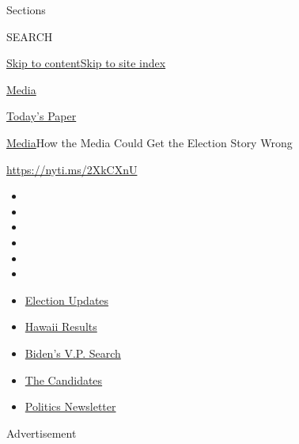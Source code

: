 Sections

SEARCH

\protect\hyperlink{site-content}{Skip to
content}\protect\hyperlink{site-index}{Skip to site index}

\href{https://www.nytimes.com/section/business/media}{Media}

\href{https://myaccount.nytimes.com/auth/login?response_type=cookie\&client_id=vi}{}

\href{https://www.nytimes.com/section/todayspaper}{Today's Paper}

\href{/section/business/media}{Media}\textbar{}How the Media Could Get
the Election Story Wrong

\href{https://nyti.ms/2XkCXnU}{https://nyti.ms/2XkCXnU}

\begin{itemize}
\item
\item
\item
\item
\item
\item
\end{itemize}

\begin{itemize}
\item
  \href{https://www.nytimes.com/2020/08/07/us/elections/biden-vs-trump.html?action=click\&pgtype=Article\&state=default\&region=TOP_BANNER\&context=storylines_menu}{Election
  Updates}
\item
  \href{https://www.nytimes.com/interactive/2020/08/08/us/elections/results-hawaii-primary-elections.html?action=click\&pgtype=Article\&state=default\&region=TOP_BANNER\&context=storylines_menu}{Hawaii
  Results}
\item
  \href{https://www.nytimes.com/article/biden-vice-president-2020.html?action=click\&pgtype=Article\&state=default\&region=TOP_BANNER\&context=storylines_menu}{Biden's
  V.P. Search}
\item
  \href{https://www.nytimes.com/interactive/2019/us/politics/2020-presidential-candidates.html?action=click\&pgtype=Article\&state=default\&region=TOP_BANNER\&context=storylines_menu}{The
  Candidates}
\item
  \href{https://www.nytimes.com/newsletters/politics?action=click\&pgtype=Article\&state=default\&region=TOP_BANNER\&context=storylines_menu}{Politics
  Newsletter}
\end{itemize}

Advertisement

